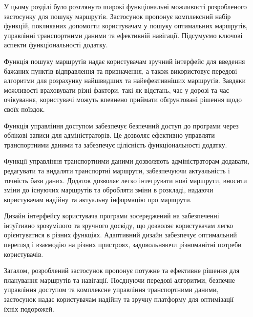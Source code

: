 
У цьому розділі було розглянуто широкі функціональні можливості розробленого застосунку для пошуку маршрутів. Застосунок пропонує комплексний набір функцій, покликаних допомогти користувачам у пошуку оптимальних маршрутів, управлінні транспортними даними та ефективній навігації. Підсумуємо ключові аспекти функціональності додатку.

Функція пошуку маршрутів надає користувачам зручний інтерфейс для введення бажаних пунктів відправлення та призначення, а також використовує передові алгоритми для розрахунку найшвидших та найефективніших маршрутів. Завдяки можливості враховувати різні фактори, такі як відстань, час у дорозі та час очікування, користувачі можуть впевнено приймати обґрунтовані рішення щодо своїх поїздок.

Функція управління доступом забезпечує безпечний доступ до програми через облікові записи для адміністраторів. Це дозволяє ефективно управляти транспортними даними та забезпечує цілісність функціональності додатку.

Функції управління транспортними даними дозволяють адміністраторам додавати, редагувати та видаляти транспортні маршрути, забезпечуючи актуальність і точність бази даних. Додаток дозволяє легко інтегрувати нові маршрути, вносити зміни до існуючих маршрутів та обробляти зміни в розкладі, надаючи користувачам надійну та актуальну інформацію про маршрути.

Дизайн інтерфейсу користувача програми зосереджений на забезпеченні інтуїтивно зрозумілого та зручного досвіду, що дозволяє користувачам легко орієнтуватися в різних функціях. Адаптивний дизайн забезпечує оптимальний перегляд і взаємодію на різних пристроях, задовольняючи різноманітні потреби користувачів.

Загалом, розроблений застосунок пропонує потужне та ефективне рішення для планування маршрутів та навігації. Поєднуючи передові алгоритми, безпечне управління доступом та комплексне управління транспортними даними, застосунок надає користувачам надійну та зручну платформу для оптимізації їхніх подорожей.
